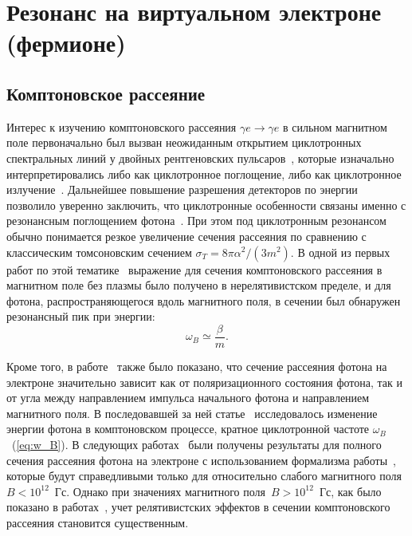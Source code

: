 \section{Резонанс на виртуальном электроне (фермионе)}
\subsection{Комптоновское рассеяние}
Интерес к изучению комптоновского рассеяния $\gamma e \to \gamma e$ в 
сильном магнитном поле первоначально был вызван неожиданным открытием циклотронных 
спектральных линий у двойных рентгеновских 
пульсаров~\cite{Truemper1978,Makishima1990,Grove1995}, которые изначально 
интерпретировались либо как циклотронное поглощение, либо как циклотронное 
излучение~\cite{Truemper1978}. Дальнейшее повышение разрешения детекторов по 
энергии позволило уверенно заключить, что циклотронные особенности связаны 
именно с резонансным поглощением фотона~\cite{Mihara:1990}.
При этом под циклотронным резонансом обычно понимается 
резкое увеличение сечения рассеяния по сравнению с классическим томсоновским 
сечением $\sigma_T = 8 \pi \alpha^2 /(3 m^2)$. В одной из первых 
работ по этой тематике~\cite{Canuto:1971} выражение для сечения 
комптоновского 
рассеяния в магнитном поле без плазмы было получено
в нерелятивистском пределе, и для фотона, 
распространяющегося вдоль магнитного поля, в сечении был обнаружен резонансный 
пик при энергии:
\begin{equation}\label{eq:w_B}
	\omega_B\simeq \frac{\beta}{m}.
\end{equation}
 
Кроме того, в работе~\cite{Canuto:1971} также было показано, что сечение рассеяния фотона 
на электроне
значительно зависит как от поляризационного состояния фотона, так и от угла 
между направлением импульса начального фотона и направлением магнитного поля. В 
последовавшей за ней 
статье~\cite{Gnedin1973} 
исследовалось изменение энергии фотона в комптоновском процессе, кратное 
циклотронной частоте $\omega_B$~(\ref{eq:w_B}). 
В следующих работах~\cite{Borner1979,Ventura:1979} 
были получены результаты для полного сечения рассеяния фотона на электроне с использованием формализма работы~\cite{Canuto:1971}, которые будут справедливыми только для относительно слабого магнитного поля~$B<10^{12}$~Гс. Однако при значениях магнитного поля~$B>10^{12}$~Гс, как было показано в работах~\cite{Herold:1979,Melrose:1983III},   учет релятивистских эффектов в сечении комптоновского рассеяния становится 
существенным.

